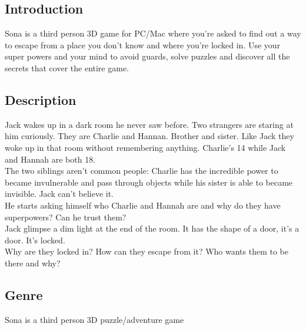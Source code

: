 \subsection{Introduction}
Sona is a third person 3D game for PC/Mac where you're asked to find out a way to escape from a place you don't know and where you're locked in. Use your super powers and your mind to avoid guards, solve puzzles and discover all the secrets that cover the entire game.

\subsection{Description}
Jack wakes up in a dark room he never saw before. Two strangers are staring at him curiously. They are Charlie and Hannan. Brother and sister. Like Jack they woke up in that room without remembering anything. Charlie’s 14 while Jack and Hannah are both 18. \\
The two siblings aren’t common people: Charlie has the incredible power to became invulnerable and pass through objects while his sister is able to became invisible. Jack can’t believe it. \\
He starts asking himself who Charlie and Hannah are and why do they have superpowers? Can he trust them? \\
Jack glimpse a dim light at the end of the room. It has the shape of a door, it’s a door. It’s locked. \\
Why are they locked in? How can they escape from it? Who wants them to be there and why?

\subsection{Genre}
Sona is a third person 3D puzzle/adventure game
